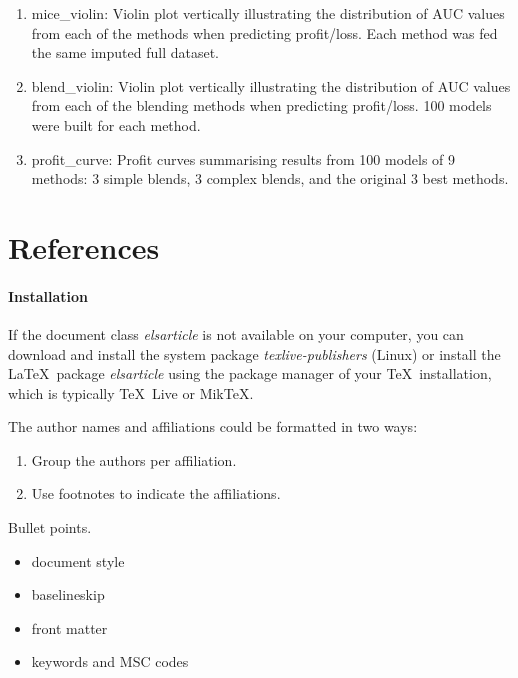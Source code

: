 \documentclass[]{elsarticle} %
\providecommand{\tightlist}{%
  \setlength{\itemsep}{0pt}\setlength{\parskip}{0pt}}
\begin{document}
\begin{enumerate}
\def\labelenumi{\arabic{enumi}.}
\tightlist
\item
  mice\_violin: Violin plot vertically illustrating the distribution of
  AUC values from each of the methods when predicting profit/loss. Each
  method was fed the same imputed full dataset.
\item
  blend\_violin: Violin plot vertically illustrating the distribution of
  AUC values from each of the blending methods when predicting
  profit/loss. 100 models were built for each method.
\item
  profit\_curve: Profit curves summarising results from 100 models of 9
  methods: 3 simple blends, 3 complex blends, and the original 3 best
  methods.
\end{enumerate}

\section*{References}\label{references}

\paragraph{Installation}\label{installation}

If the document class \emph{elsarticle} is not available on your
computer, you can download and install the system package
\emph{texlive-publishers} (Linux) or install the LaTeX~package
\emph{elsarticle} using the package manager of your TeX~installation,
which is typically TeX~Live or MikTeX.

The author names and affiliations could be formatted in two ways:

\begin{enumerate}
\def\labelenumi{(\arabic{enumi})}
\item
  Group the authors per affiliation.
\item
  Use footnotes to indicate the affiliations.
\end{enumerate}

Bullet points.

\begin{itemize}
\item
  document style
\item
  baselineskip
\item
  front matter
\item
  keywords and MSC codes
\end{itemize}
\end{document}
